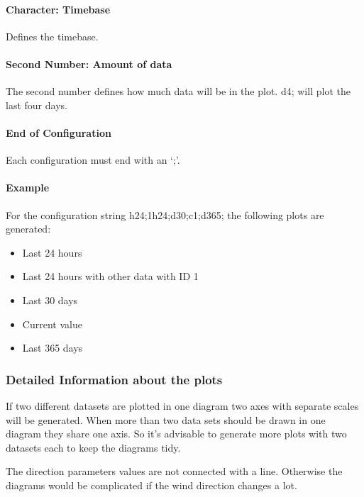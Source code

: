 \paragraph{Character: Timebase} %
\label{par:character}
Defines the timebase.
\paragraph{Second Number: Amount of data} %
\label{par:number}
The second number defines how much data will be in the plot. {\C d4;} will plot the last four days.
\paragraph{End of Configuration} %
\label{par:end_of_configuration}
Each configuration must end with an {\C `;'}.

\paragraph{Example} %
\label{par:example}
For the configuration string {\C h24;1h24;d30;c1;d365;} the following plots are generated:
\begin{itemize}
	\item Last 24 hours
	\item Last 24 hours with other data with ID 1 
	\item Last 30 days
	\item Current value
	\item Last 365 days
\end{itemize}


\subsubsection{Detailed Information about the plots} %
\label{ssub:detailed_information_about_the_plots}
If two different datasets are plotted in one diagram two axes with separate scales will be generated. When more than two data sets should be drawn in one diagram they share one axis. So it's advisable to generate more plots with two datasets each to keep the diagrams tidy.

The direction parameters values are not connected with a line. Otherwise the diagrams would be complicated if the wind direction changes a lot.

